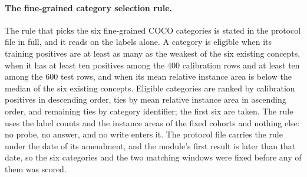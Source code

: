 \documentclass{article}
\begin{document}
\FloatBarrier

\paragraph{The fine-grained category selection rule.} The rule that picks the six fine-grained COCO categories is stated in the protocol file in full, and it reads on the labels alone. A category is eligible when its training positives are at least as many as the weakest of the six existing concepts, when it has at least ten positives among the 400 calibration rows and at least ten among the 600 test rows, and when its mean relative instance area is below the median of the six existing concepts. Eligible categories are ranked by calibration positives in descending order, ties by mean relative instance area in ascending order, and remaining ties by category identifier; the first six are taken. The rule uses the label counts and the instance areas of the fixed cohorts and nothing else: no probe, no answer, and no write enters it. The protocol file carries the rule under the date of its amendment, and the module's first result is later than that date, so the six categories and the two matching windows were fixed before any of them was scored.
\end{document}
